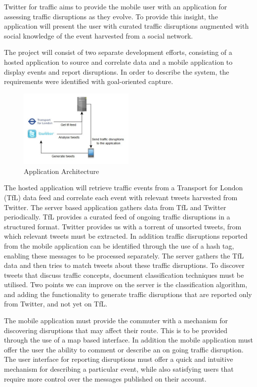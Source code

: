Twitter for traffic aims to provide the mobile user with an application for assessing traffic disruptions as they evolve. To provide this insight, the application will present the user with curated traffic disruptions augmented with social knowledge of the event harvested from a social network.

The project will consist of two separate development efforts, consisting of a hosted application to source and correlate data and a mobile application to display events and report disruptions. In order to describe the system, the requirements were identified with goal-oriented capture\cite{Requirements}.

\begin{figure}[here]
\begin{center}
\includegraphics[width=0.5\textwidth]{images/draft_architecture.jpg}
\end{center}
\caption{Application Architecture}
\end{figure}

The hosted application will retrieve traffic events from a Transport for London (TfL) data feed and correlate each event with relevant tweets harvested from Twitter. The server based application gathers data from TfL and Twitter periodically. TfL provides a curated feed of ongoing traffic disruptions in a structured format. Twitter provides us with a torrent of unsorted tweets, from which relevant tweets must be extracted. In addition traffic disruptions reported from the mobile application can be identified through the use of a hash tag, enabling these messages to be processed separately. The server gathers the TfL data and then tries to match tweets about these traffic disruptions. To discover tweets that discuss traffic concepts, document classification techniques must be utilised. Two points we can improve on the server is the classification algorithm, and adding the functionality to generate traffic disruptions that are reported only from Twitter, and not yet on TfL.

The mobile application must provide the commuter with a mechanism for discovering disruptions that may affect their route. This is to be provided through the use of a map based interface. In addition the mobile application must offer the user the ability to comment or describe an on going traffic disruption. The user interface for reporting disruptions must offer a quick and intuitive mechanism for describing a particular event, while also satisfying users that require more control over the messages published on their account.

